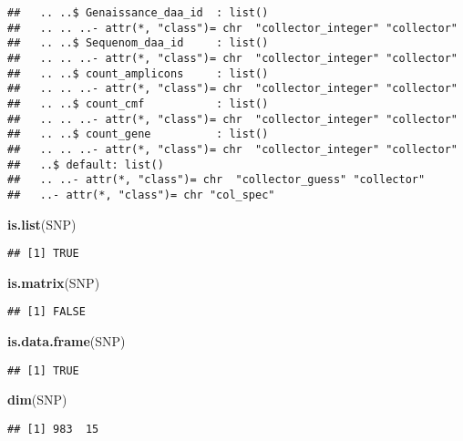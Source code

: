 \documentclass[]{article}
\newenvironment{Shaded}{\begin{snugshade}}{\end{snugshade}}
\newcommand{\KeywordTok}[1]{\textcolor[rgb]{0.13,0.29,0.53}{\textbf{#1}}}
\newcommand{\NormalTok}[1]{#1}
\begin{document}
\begin{verbatim}
##   .. ..$ Genaissance_daa_id  : list()
##   .. .. ..- attr(*, "class")= chr  "collector_integer" "collector"
##   .. ..$ Sequenom_daa_id     : list()
##   .. .. ..- attr(*, "class")= chr  "collector_integer" "collector"
##   .. ..$ count_amplicons     : list()
##   .. .. ..- attr(*, "class")= chr  "collector_integer" "collector"
##   .. ..$ count_cmf           : list()
##   .. .. ..- attr(*, "class")= chr  "collector_integer" "collector"
##   .. ..$ count_gene          : list()
##   .. .. ..- attr(*, "class")= chr  "collector_integer" "collector"
##   ..$ default: list()
##   .. ..- attr(*, "class")= chr  "collector_guess" "collector"
##   ..- attr(*, "class")= chr "col_spec"
\end{verbatim}

\begin{Shaded}
\begin{Highlighting}[]
\KeywordTok{is.list}\NormalTok{(SNP)}
\end{Highlighting}
\end{Shaded}

\begin{verbatim}
## [1] TRUE
\end{verbatim}

\begin{Shaded}
\begin{Highlighting}[]
\KeywordTok{is.matrix}\NormalTok{(SNP)}
\end{Highlighting}
\end{Shaded}

\begin{verbatim}
## [1] FALSE
\end{verbatim}

\begin{Shaded}
\begin{Highlighting}[]
\KeywordTok{is.data.frame}\NormalTok{(SNP)}
\end{Highlighting}
\end{Shaded}

\begin{verbatim}
## [1] TRUE
\end{verbatim}

\begin{Shaded}
\begin{Highlighting}[]
\KeywordTok{dim}\NormalTok{(SNP)}
\end{Highlighting}
\end{Shaded}

\begin{verbatim}
## [1] 983  15
\end{verbatim}
\end{document}
